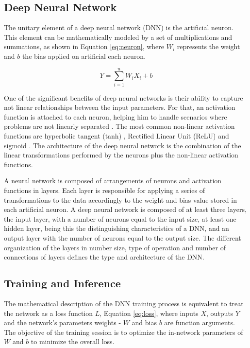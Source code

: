 \subsection{Deep Neural Network}
The unitary element of a deep neural network (DNN) is the artificial neuron. This element can be mathematically modeled by a set of multiplications and summations, as shown in Equation \ref{eq:neuron}, where $W_i$ represents the weight and $b$ the bias applied on artificial each neuron.

\begin{equation}
\label{eq:neuron}
    Y = \sum_{i=1}^{n} W_iX_i+b
\end{equation}

One of the significant benefits of deep neural networks is their ability to capture not linear relationships between the input parameters. For that, an activation function is attached to each neuron, helping him to handle scenarios where problems are not linearly separated \cite{dong_dnnmark:_2017}. The most common non-linear activation functions are  hyperbolic tangent (tanh) \cite{orr_neural_1998}, Rectified Linear Unit (ReLU) \cite{orr_neural_1998} and sigmoid \cite{orr_neural_1998}. The architecture of the deep neural network is the combination of the linear transformations performed by the neurons plus the non-linear activation functions.

A neural network is composed of arrangements of neurons and activation functions in layers. Each layer is responsible for applying a series of transformations to the data accordingly to the weight and bias value stored in each artificial neuron. A deep neural network is composed of at least three layers, the input layer, with a number of neurons equal to the input size, at least one hidden layer, being this the distinguishing characteristics of a DNN, and an output layer with the number of neurons equal to the output size. The different organization of the layers in number size, type of operation and number of connections of layers defines the type and architecture of the DNN.

\subsection{Training and Inference}
The mathematical description of the  DNN training process is equivalent to treat the network as a loss function $L$, Equation \ref{eq:loss}, where inputs $X$, outputs $Y$ and the network's parameters weights - $W$ and bias $b$ are function arguments. The objective of the training session is to optimize the in-network parameters of $W$ and $b$ to minimize the overall loss.

